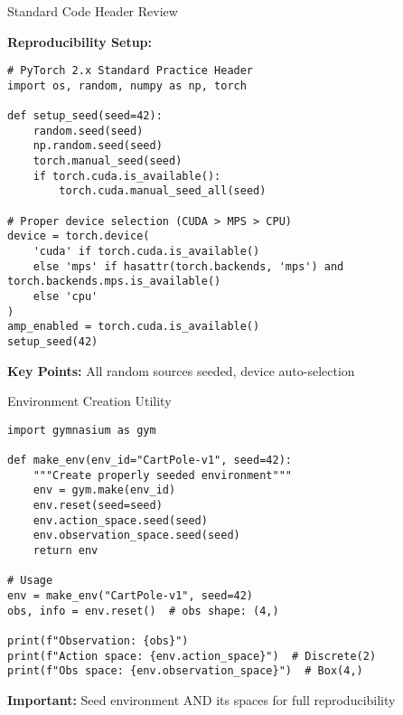 \documentclass[aspectratio=169,10pt]{beamer}
\begin{document}
\begin{frame}[fragile]{Standard Code Header Review}

\textbf{Reproducibility Setup:}

\begin{lstlisting}
# PyTorch 2.x Standard Practice Header
import os, random, numpy as np, torch

def setup_seed(seed=42):
    random.seed(seed)
    np.random.seed(seed)  
    torch.manual_seed(seed)
    if torch.cuda.is_available():
        torch.cuda.manual_seed_all(seed)

# Proper device selection (CUDA > MPS > CPU)
device = torch.device(
    'cuda' if torch.cuda.is_available() 
    else 'mps' if hasattr(torch.backends, 'mps') and torch.backends.mps.is_available()
    else 'cpu'
)
amp_enabled = torch.cuda.is_available()
setup_seed(42)
\end{lstlisting}

\textbf{Key Points:} All random sources seeded, device auto-selection

\end{frame}

\begin{frame}[fragile]{Environment Creation Utility}

\begin{lstlisting}
import gymnasium as gym

def make_env(env_id="CartPole-v1", seed=42):
    """Create properly seeded environment"""
    env = gym.make(env_id)
    env.reset(seed=seed)
    env.action_space.seed(seed)
    env.observation_space.seed(seed)
    return env

# Usage
env = make_env("CartPole-v1", seed=42)
obs, info = env.reset()  # obs shape: (4,)

print(f"Observation: {obs}")
print(f"Action space: {env.action_space}")  # Discrete(2)
print(f"Obs space: {env.observation_space}")  # Box(4,)
\end{lstlisting}

\vfill

\textbf{Important:} Seed environment AND its spaces for full reproducibility

\end{frame}
\end{document}

